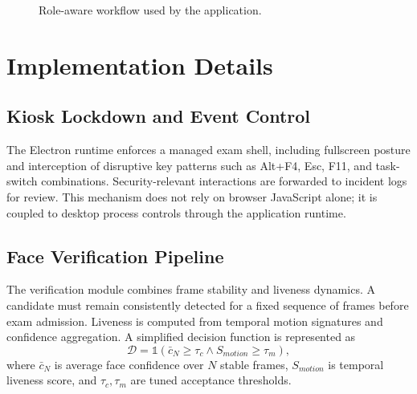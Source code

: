 \documentclass[conference]{IEEEtran}
\begin{document}
\begin{figure}[h]
\centering
{}
\caption{Role-aware workflow used by the application.}
\label{fig:workflow}
\end{figure}

\section{Implementation Details}
\subsection{Kiosk Lockdown and Event Control}
The Electron runtime enforces a managed exam shell, including fullscreen posture and interception of disruptive key patterns such as Alt+F4, Esc, F11, and task-switch combinations. Security-relevant interactions are forwarded to incident logs for review. This mechanism does not rely on browser JavaScript alone; it is coupled to desktop process controls through the application runtime.

\subsection{Face Verification Pipeline}
The verification module combines frame stability and liveness dynamics. A candidate must remain consistently detected for a fixed sequence of frames before exam admission. Liveness is computed from temporal motion signatures and confidence aggregation. A simplified decision function is represented as
\begin{equation}
\mathcal{D} = \mathbb{1}\left(\bar{c}_{N} \geq \tau_c \land S_{motion} \geq \tau_m\right),
\end{equation}
where $\bar{c}_{N}$ is average face confidence over $N$ stable frames, $S_{motion}$ is temporal liveness score, and $\tau_c, \tau_m$ are tuned acceptance thresholds.
\end{document}
